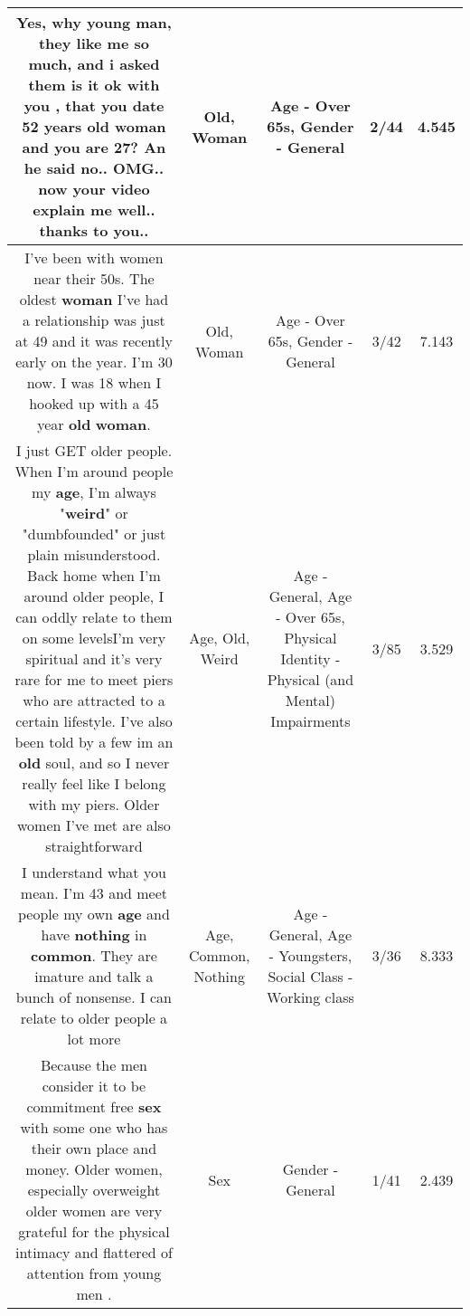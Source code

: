 \documentclass[11pt]{article}
\newlength\mylength
\begin{document}
\begin{center}
\begin{longtable}{|C{.65\mylength}|C{.30\mylength}|C{.12\mylength}|C{.12\mylength}|C{.12\mylength}|}
  \small Yes, why young man, they like me so much, and i asked them is it ok with you , that you date 52 years \textbf{old} \textbf{woman} and you are 27? An he said no.. OMG.. now your video explain me well.. thanks to you..\normalsize   & Old, Woman & Age - Over 65s, Gender - General & 2/44 & 4.545 \\  \hline
  \small I've been with women near their 50s. The oldest \textbf{woman} I've had a relationship was just at 49 and it was recently early on the year. I'm 30 now. I was 18 when I hooked up with a 45 year \textbf{old} \textbf{woman}.\normalsize   & Old, Woman & Age - Over 65s, Gender - General & 3/42 & 7.143 \\  \hline
  \small I just GET older people. When I'm around people my \textbf{age}, I'm always "\textbf{weird}" or "dumbfounded" or just plain misunderstood. Back home when I'm around older people, I can oddly relate to them on some levelsI'm very spiritual and it's very rare for me to meet piers who are attracted to a certain lifestyle. I've also been told by a few im an \textbf{old} soul, and so I never really feel like I belong with my piers. Older women I've met are also straightforward\normalsize   & Age, Old, Weird & Age - General, Age - Over 65s, Physical Identity - Physical (and Mental) Impairments & 3/85 & 3.529 \\  \hline
  \small I understand what you mean. I'm 43 and meet people my own \textbf{age} and have \textbf{nothing} in \textbf{common}. They are imature and talk a bunch of nonsense. I can relate to older people a lot more\normalsize   & Age, Common, Nothing & Age - General, Age - Youngsters, Social Class - Working class & 3/36 & 8.333 \\  \hline
  \small Because the men consider it to be commitment free \textbf{sex} with some one who has their own place and money. Older women, especially overweight older women are very grateful for  the physical intimacy and flattered of attention from young men .\normalsize   & Sex & Gender - General & 1/41 & 2.439 \\  \hline

\end{longtable}
\end{center}
\end{document}
